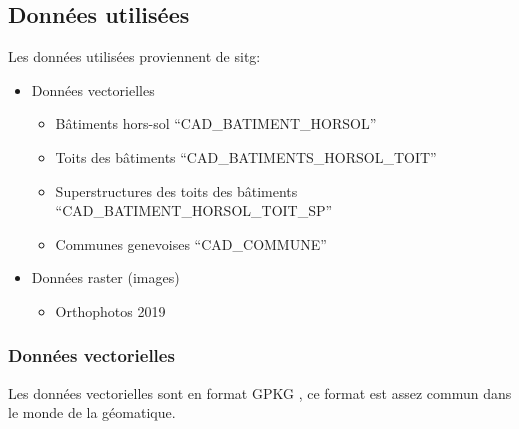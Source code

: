 \subsection{Données utilisées}
Les données utilisées proviennent de \acrshort{sitg}:
\begin{itemize}
    \item Données vectorielles
    \begin{itemize}
        \item Bâtiments hors-sol ``CAD\_BATIMENT\_HORSOL'' \cite{sitg_batiments_nodate}
        \item Toits des bâtiments ``CAD\_BATIMENTS\_HORSOL\_TOIT'' \cite{sitg_toits_nodate}
        \item Superstructures des toits des bâtiments ``CAD\_BATIMENT\_HORSOL\_TOIT\_SP'' \cite{sitg_superstructures_nodate}
        \item Communes genevoises ``CAD\_COMMUNE'' \cite{sitg_communes_nodate}
    \end{itemize}
    \item Données raster (images)
    \begin{itemize}
        \item Orthophotos 2019 \cite{sitg_orthophotos_nodate}
    \end{itemize}
\end{itemize}
\subsubsection{Données vectorielles}
Les données vectorielles sont en format GPKG \cite{noauthor_ogc_nodate}, ce format est assez commun dans le monde de la géomatique.
